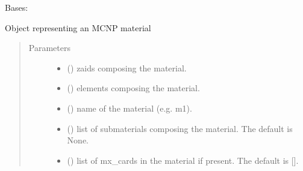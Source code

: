 \documentclass[letterpaper,10pt,english]{sphinxmanual}
\begin{document}
\begin{fulllineitems}
\label{\detokenize{api/inputgeneration:matreader.Material}}
\sphinxAtStartPar
Bases: 

\sphinxAtStartPar
Object representing an MCNP material
\begin{quote}\begin{description}
\item[{Parameters}] \leavevmode\begin{itemize}
\item {} 
\sphinxAtStartPar
{} (\sphinxstyleliteralemphasis{\sphinxupquote{{[}}}\sphinxstyleliteralemphasis{\sphinxupquote{{]}}}) \textendash{} zaids composing the material.

\item {} 
\sphinxAtStartPar
{} (\sphinxstyleliteralemphasis{\sphinxupquote{{[}}}\sphinxstyleliteralemphasis{\sphinxupquote{{]}}}) \textendash{} elements composing the material.

\item {} 
\sphinxAtStartPar
{} () \textendash{} name of the material (e.g. m1).

\item {} 
\sphinxAtStartPar
{} (\sphinxstyleliteralemphasis{\sphinxupquote{{[}}}\sphinxstyleliteralemphasis{\sphinxupquote{{]}}}\sphinxstyleliteralemphasis{\sphinxupquote{, }}) \textendash{} list of submaterials composing the material. The default is None.

\item {} 
\sphinxAtStartPar
{} (\sphinxstyleliteralemphasis{\sphinxupquote{, }}) \textendash{} list of mx\_cards in the material if present. The default is {[}{]}.


\end{itemize}
\end{description}
\end{quote}
\end{fulllineitems}
\end{document}

